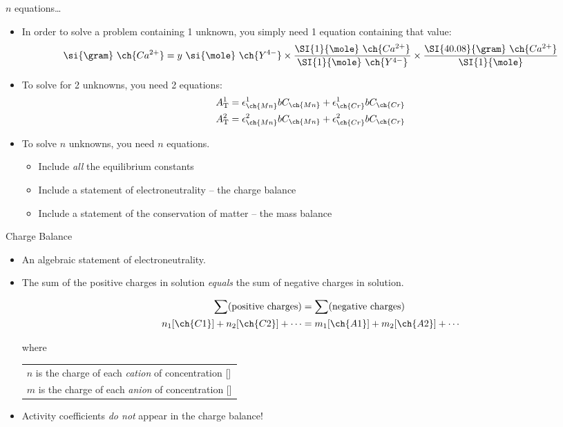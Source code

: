 \documentclass[notes=onlyslideswithnotes,notes=hide]{beamer}
\begin{document}
\begin{frame}{$n$ equations\ldots}
	\begin{itemize}[<+->]
		\item In order to solve a problem containing 1 unknown, you
			simply need 1 equation containing that value:
			\begin{align*}
				\si{\gram}~\ch{Ca^{2+}} =
				y~\si{\mole}~\ch{Y^{4-}} \times
				\dfrac{\SI{1}{\mole}~\ch{Ca^{2+}}}
				{\SI{1}{\mole}~\ch{Y^{4-}}} \times
				\dfrac{\SI{40.08}{\gram}~\ch{Ca^{2+}}}
				{\SI{1}{\mole}}
			\end{align*}
		\item To solve for 2 unknowns, you need 2 equations:
			\begin{align*}
				A^1_{\text{T}} &=
				\epsilon^1_{\ch{Mn}}bC_{\ch{Mn}} +
				\epsilon^1_{\ch{Cr}}bC_{\ch{Cr}} \\
				A^2_{\text{T}} &=
				\epsilon^2_{\ch{Mn}}bC_{\ch{Mn}} +
				\epsilon^2_{\ch{Cr}}bC_{\ch{Cr}}
			\end{align*}
		\item To solve $n$ unknowns, you need $n$ equations.
			\begin{itemize}
				\item Include \emph{all} the \alert{equilibrium
					constants}
				\item Include a statement of electroneutrality
					-- the \alert{charge balance}
				\item Include a statement of the conservation of
					matter -- the \alert{mass balance}
			\end{itemize}
	\end{itemize}
\end{frame}

\begin{frame}{Charge Balance}
	\begin{itemize}
		\item An algebraic statement of electroneutrality.
		\item The sum of the positive charges in solution \emph{equals}
			the sum of negative charges in solution.

			\begin{align*}
				\sum(\text{positive charges}) &=
				\sum(\text{negative charges}) \\
				n_1[\ch{C1}] + n_2[\ch{C2}] + \cdots &=
				m_1[\ch{A1}] + m_2[\ch{A2}] + \cdots
			\end{align*}
		
			where
		
			\begin{tabu} to \linewidth {X}
				$n$ is the charge of each \emph{cation} of
				concentration [] \\
				$m$ is the charge of each \emph{anion} of
				concentration []
			\end{tabu}
	
		\item Activity coefficients \emph{do not} appear in the charge
			balance!
	\end{itemize}
\end{frame}
\end{document}
